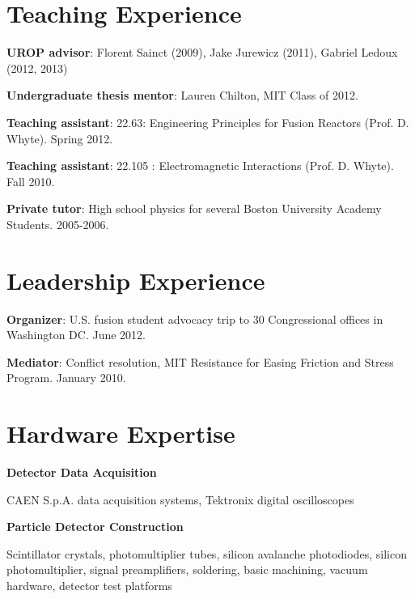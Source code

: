 \documentclass[10pt]{article}
\begin{document}
\section{Teaching Experience}
\begin{innerlist}
\item \textbf{UROP advisor}: Florent Sainct (2009), Jake Jurewicz (2011), Gabriel Ledoux (2012, 2013)
\item \textbf{Undergraduate thesis mentor}: Lauren Chilton, MIT Class of 2012.
\item \textbf{Teaching assistant}: 22.63: Engineering Principles for Fusion Reactors (Prof. D. Whyte). Spring 2012.
\item \textbf{Teaching assistant}: 22.105 : Electromagnetic Interactions (Prof. D. Whyte). Fall 2010.
\item \textbf{Private tutor}: High school physics for several Boston University Academy Students. 2005-2006. 
\end{innerlist}

\section{Leadership Experience}
\begin{innerlist}
\item \textbf{Organizer}: U.S. fusion student advocacy trip to 30 Congressional offices in Washington DC. June 2012.
\item \textbf{Mediator}: Conflict resolution, MIT Resistance for Easing Friction and Stress Program. January 2010.
\end{innerlist}

\section{Hardware Expertise}
\textbf{Detector Data Acquisition}
\begin{innerlist}
  \item CAEN S.p.A. data acquisition systems, Tektronix digital oscilloscopes
\end{innerlist}

\halfblankline

\textbf{Particle Detector Construction}
\begin{innerlist}
\item Scintillator crystals, photomultiplier tubes, silicon avalanche
  photodiodes, silicon photomultiplier, signal preamplifiers,
  soldering, basic machining, vacuum hardware, detector test platforms
\end{innerlist}
\end{document}
